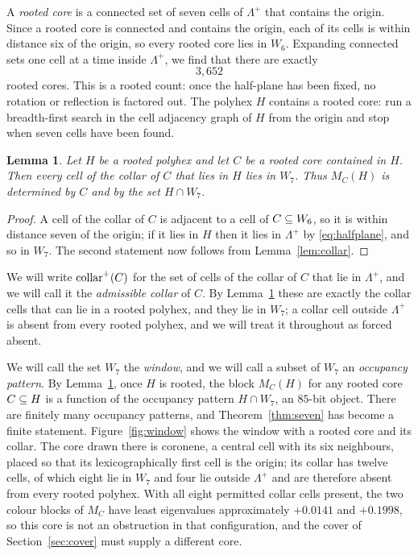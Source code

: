 \documentclass[11pt]{article}
\newcommand\collarp{\opk{collar}^{+}}
\newtheorem{lemma}[theorem]{Lemma}
\theoremstyle{definition}
\begin{document}
A \textsl{rooted core} is a connected set of seven cells of $\Lambda^{+}$ that
contains the origin.  Since a rooted core is connected and contains the
origin, each of its cells is within distance six of the origin, so every
rooted core lies in $W_6$.  Expanding connected sets one cell at a time
inside $\Lambda^{+}$, we find that there are exactly
\begin{equation}\label{eq:cores}
 3{,}652
\end{equation}
rooted cores.  This is a rooted count: once the half-plane has been fixed,
no rotation or reflection is factored out.  The polyhex $H$ contains a rooted
core: run a breadth-first search in the cell adjacency graph of $H$ from the
origin and stop when seven cells have been found.

\begin{lemma}\label{lem:local}
Let $H$ be a rooted polyhex and
let $C$ be a rooted core contained in $H$.  Then every cell of the collar of
$C$ that lies in $H$ lies in $W_7$.  Thus $M_C(H)$ is determined by
$C$ and by the set $H\cap W_7$.
\end{lemma}

\begin{proof}
A cell of the collar of $C$ is adjacent to a cell of $C\subseteq W_6$, so it is
within distance seven of the origin; if it lies in $H$ then it lies in
$\Lambda^{+}$ by \eqref{eq:halfplane}, and so in $W_7$.  The second statement now
follows from Lemma~\ref{lem:collar}.
\end{proof}

We will write $\collarp(C)$ for the set of cells of the collar of $C$ that lie
in $\Lambda^{+}$, and we will call it the \textsl{admissible collar} of $C$.
By Lemma~\ref{lem:local} these are exactly the collar cells that can lie in a
rooted polyhex, and they lie in $W_7$; a collar cell outside $\Lambda^{+}$ is
absent from every rooted polyhex, and we will treat it throughout as forced
absent.

We will call the set $W_7$ the \textsl{window}, and we will call a subset of
$W_7$ an \textsl{occupancy pattern}.  By
Lemma~\ref{lem:local}, once $H$ is rooted, the block $M_C(H)$ for any rooted
core $C\subseteq H$ is a function of the occupancy pattern $H\cap W_7$, an
$85$-bit object.  There are finitely many occupancy patterns, and
Theorem~\ref{thm:seven} has become a finite statement.  Figure~\ref{fig:window}
shows the window with a rooted core and its collar.  The core drawn there is
coronene, a central cell with its six neighbours, placed so that its
lexicographically first cell is the origin; its collar has twelve cells, of
which eight lie in $W_7$ and four lie outside $\Lambda^{+}$ and are therefore
absent from every rooted polyhex.  With all eight permitted collar cells
present, the two colour blocks of $M_C$ have least eigenvalues approximately
$+0.0141$ and $+0.1998$, so this core is not an obstruction in that
configuration, and the cover of Section~\ref{sec:cover} must supply a
different core.
\end{document}
